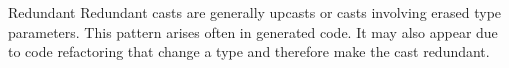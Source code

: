 \begin{pattern}{Redundant}
\issues{}
Redundant casts are generally upcasts or casts involving erased type parameters.
This pattern arises often in generated code.
It may also appear due to code refactoring that change a type and therefore make the cast redundant.
    
\end{pattern}
